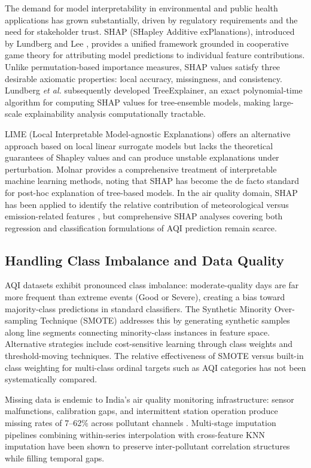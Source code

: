\documentclass[conference]{IEEEtran}
\begin{document}
The demand for model interpretability in environmental and public health applications has grown substantially, driven by regulatory requirements and the need for stakeholder trust. SHAP (SHapley Additive exPlanations), introduced by Lundberg and Lee \cite{lundberg2017}, provides a unified framework grounded in cooperative game theory for attributing model predictions to individual feature contributions. Unlike permutation-based importance measures, SHAP values satisfy three desirable axiomatic properties: local accuracy, missingness, and consistency. Lundberg \textit{et al.} \cite{lundberg2020} subsequently developed TreeExplainer, an exact polynomial-time algorithm for computing SHAP values for tree-ensemble models, making large-scale explainability analysis computationally tractable.

LIME (Local Interpretable Model-agnostic Explanations) \cite{ribeiro2016} offers an alternative approach based on local linear surrogate models but lacks the theoretical guarantees of Shapley values and can produce unstable explanations under perturbation. Molnar \cite{molnar2022} provides a comprehensive treatment of interpretable machine learning methods, noting that SHAP has become the de facto standard for post-hoc explanation of tree-based models. In the air quality domain, SHAP has been applied to identify the relative contribution of meteorological versus emission-related features \cite{masood2023}, but comprehensive SHAP analyses covering both regression and classification formulations of AQI prediction remain scarce.

\subsection{Handling Class Imbalance and Data Quality}

AQI datasets exhibit pronounced class imbalance: moderate-quality days are far more frequent than extreme events (Good or Severe), creating a bias toward majority-class predictions in standard classifiers. The Synthetic Minority Over-sampling Technique (SMOTE) \cite{chawla2002} addresses this by generating synthetic samples along line segments connecting minority-class instances in feature space. Alternative strategies include cost-sensitive learning through class weights and threshold-moving techniques. The relative effectiveness of SMOTE versus built-in class weighting for multi-class ordinal targets such as AQI categories has not been systematically compared.

Missing data is endemic to India's air quality monitoring infrastructure: sensor malfunctions, calibration gaps, and intermittent station operation produce missing rates of 7--62\% across pollutant channels \cite{cpcb2014}. Multi-stage imputation pipelines combining within-series interpolation with cross-feature KNN imputation \cite{troyanskaya2001} have been shown to preserve inter-pollutant correlation structures while filling temporal gaps.
\end{document}
